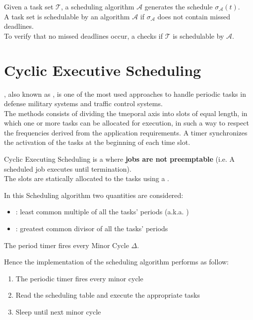 Given a task set $\mathcal{T}$, a scheduling algorithm $\mathcal{A}$ generates the schedule $\sigma_\mathcal{A}(t)$.\\
A task set is schedulable by an algorithm $\mathcal{A}$ if $\sigma_\mathcal{A}$ does not contain missed deadlines.\\
To verify that no missed deadlines occur, a  checks if $\mathcal{T}$ is schedulable by $\mathcal{A}$.

\section{Cyclic Executive Scheduling}

, also known as , is one of the most used approaches to handle periodic tasks in defense military systems and traffic control systems.\\
The methods consists of dividing the tmeporal axis into slots of equal length, in which one or more tasks can be allocated for execution, in such a way to respect the frequencies derived from the application requirements. A timer synchronizes the activation of the tasks at the beginning of each time slot.

Cyclic Executing Scheduling is a  where \textbf{jobs are not preemptable} (i.e. A scheduled job executes until termination).\\
The slots are statically allocated to the tasks using a .

In this Scheduling algorithm two quantities are considered:
\begin{itemize}
    \item {}: least common multiple of all the tasks' periods (a.k.a. )
    \item {}: greatest common divisor of all the tasks' periods
\end{itemize}
The period timer fires every Minor Cycle $\Delta$.

Hence the implementation of the scheduling algorithm performs as follow:
\begin{enumerate}
    \item The periodic timer fires every minor cycle
    \item Read the scheduling table and execute the appropriate tasks
    \item Sleep until next minor cycle
\end{enumerate}

